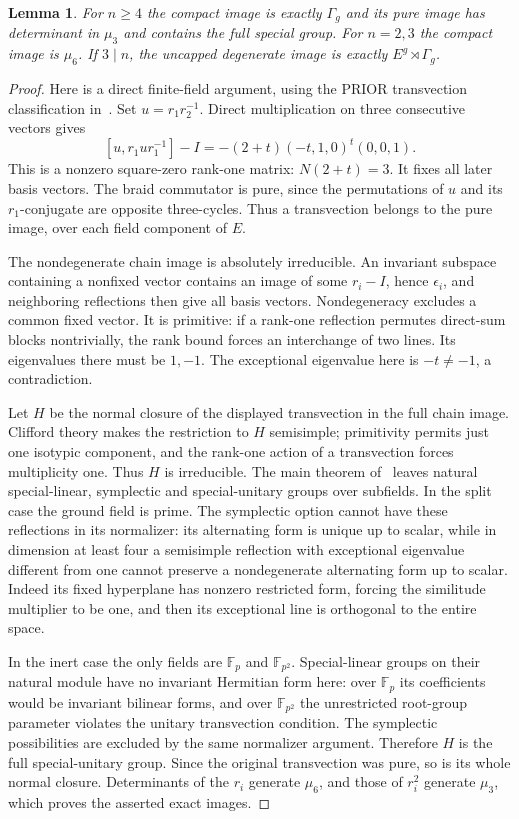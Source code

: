 \documentclass[11pt]{amsart}
\newtheorem{lemma}[theorem]{Lemma}
\newcommand{\Fp}{\mathbb F_p}
\begin{document}
\begin{lemma}\label{finiteimage}
For $n\ge4$ the compact image is exactly $\Gamma_g$ and its pure
image has determinant in $\mu_3$ and contains the full special group.
For $n=2,3$ the compact image is $\mu_6$. If $3\mid n$, the
uncapped degenerate image is exactly $E^g\rtimes\Gamma_g$.
\end{lemma}
\begin{proof}
Here is a direct finite-field argument, using the
PRIOR transvection classification in~\cite{ZS}.
Set $u=r_1r_2^{-1}$. Direct multiplication on three consecutive
vectors gives
\[
[u,r_1ur_1^{-1}]-I
=-(2+t)(-t,1,0)^t(0,0,1).
\]
This is a nonzero square-zero rank-one matrix: $N(2+t)=3$.
It fixes all later basis vectors. The braid commutator is pure,
since the permutations of $u$ and its $r_1$-conjugate are opposite
three-cycles. Thus a transvection belongs to the pure image, over
each field component of $E$.

The nondegenerate chain image is absolutely irreducible. An invariant
subspace containing a nonfixed vector contains an image of some
$r_i-I$, hence $\epsilon_i$, and neighboring reflections then give
all basis vectors. Nondegeneracy excludes a common fixed vector.
It is primitive: if a rank-one reflection permutes direct-sum blocks
nontrivially, the rank bound forces an interchange of two lines.
Its eigenvalues there must be $1,-1$. The exceptional eigenvalue
here is $-t\ne-1$, a contradiction.

Let $H$ be the normal closure of the displayed transvection in the
full chain image. Clifford theory makes the restriction to $H$
semisimple; primitivity permits just one isotypic component, and
the rank-one action of a transvection forces multiplicity one.
Thus $H$ is irreducible. The main theorem of~\cite{ZS} leaves natural
special-linear, symplectic and special-unitary groups over subfields.
In the split case the ground field is prime. The symplectic option
cannot have these reflections in its normalizer: its alternating
form is unique up to scalar, while in dimension at least four a
semisimple reflection with exceptional eigenvalue different from one
cannot preserve a nondegenerate alternating form up to scalar.
Indeed its fixed hyperplane has nonzero restricted form, forcing the
similitude multiplier to be one, and then its exceptional line is
orthogonal to the entire space.

In the inert case the only fields are $\Fp$ and $\mathbb F_{p^2}$.
Special-linear groups on their natural module have no invariant
Hermitian form here: over $\Fp$ its coefficients would be invariant
bilinear forms, and over $\mathbb F_{p^2}$ the unrestricted root-group
parameter violates the unitary transvection condition. The symplectic
possibilities are excluded by the same normalizer argument. Therefore
$H$ is the full special-unitary group. Since the original transvection
was pure, so is its whole normal closure. Determinants of the
$r_i$ generate $\mu_6$, and those of $r_i^2$ generate $\mu_3$,
which proves the asserted exact images.


\end{proof}
\end{document}
